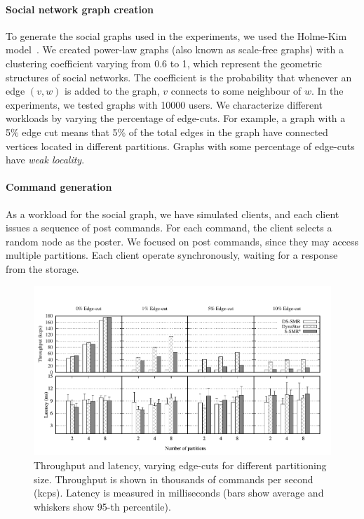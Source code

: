 \paragraph*{Social network graph creation}
%
To generate the social graphs used in the experiments, we used the
Holme-Kim model~\cite{holme-kim}. We created power-law graphs (also
known as scale-free graphs) with a clustering coefficient varying from
0.6 to 1, which represent the geometric structures of social
networks. The coefficient is the probability that whenever an edge
$(v, w)$ is added to the graph, $v$ connects to some neighbour of $w$.
In the experiments, we tested graphs with 10000 users. We characterize
different workloads by varying the percentage of edge-cuts.  For
example, a graph with a 5\% edge cut means that 5\% of the total edges
in the graph have connected vertices located in different partitions.
Graphs with some percentage of edge-cuts have \emph{weak locality}.

\paragraph*{Command generation}
%
As a workload for the social graph, we have simulated clients,
and each client issues a sequence of post
commands.  For each command, the client selects a random node as
the poster.  We focused on post commands, since they may access
multiple partitions. Each client operate synchronously,
waiting for a response from the storage.

\begin{figure}[ht!]
	\includegraphics{figures/socc/socc-throughput-latency-avg-all}
	\caption{Throughput and latency, varying edge-cuts for different partitioning size. 
  Throughput is shown in thousands of commands per second (kcps). 
  Latency is measured in milliseconds (bars show average and whiskers show 95-th percentile).}
	\label{fig:varying_edge_cut}
\end{figure}



